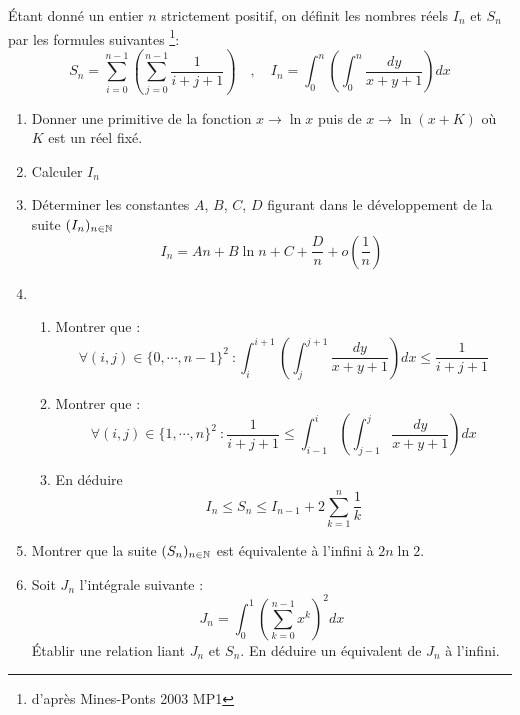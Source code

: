{\'E}tant donné un entier $n$ strictement positif, on définit les nombres réels $I_n$ et $S_n$ par les formules suivantes \footnote{d'après Mines-Ponts 2003 MP1}:
\[S_n=\sum_{i=0}^{n-1}\left( \sum_{j=0}^{n-1}\dfrac{1}{i+j+1}\right) \quad,\quad
  I_n=\int_{0}^{n}\left(\int_{0}^{n}\dfrac{dy}{x+y+1} \right)dx \]
  \begin{enumerate}
\item Donner une primitive de la fonction $x\rightarrow \ln x$ puis de $x\rightarrow \ln (x + K)$ où $K$ est un réel fixé.
\item Calculer $I_n$
\item Déterminer les constantes $A$, $B$, $C$, $D$ figurant dans le développement de la suite $(I_n)_{n \in \mathbb{N}}$
\[I_n= An +B \ln n + C + \dfrac{D}{n} +o(\frac{1}{n})\]
\item \begin{enumerate}
  \item Montrer que :
  \[\forall (i,j) \in \{0, \cdots, n-1\}^2\:
  :\int_{i}^{i+1}\left(\int_{j}^{j+1}\frac{dy}{x+y+1} \right)dx \leq \frac{1}{i+j+1}\]
  \item Montrer que :
  \[\forall (i,j) \in \{1, \cdots, n\}^2\:
  : \frac{1}{i+j+1} \leq \int_{i-1}^{i} \left( \int_{j-1}^{j}\frac{dy}{x+y+1} \right)dx\]
  \item En déduire
  \[I_n \leq S_n \leq I_{n-1}+2\sum_{k=1}^{n}\frac{1}{k}\]
      \end{enumerate}
\item Montrer que la suite $(S_n)_{n\in \mathbb{N}}$ est équivalente à l'infini à $2n \ln 2$.
\item Soit $J_n$ l'intégrale suivante :
\[J_n = \int_0^1\left( \sum_{k=0}^{n-1}x^k\right)^2 dx\]
{\'E}tablir une relation liant $J_n$ et $S_n$. En déduire un équivalent de $J_n$ à l'infini.
\end{enumerate}
